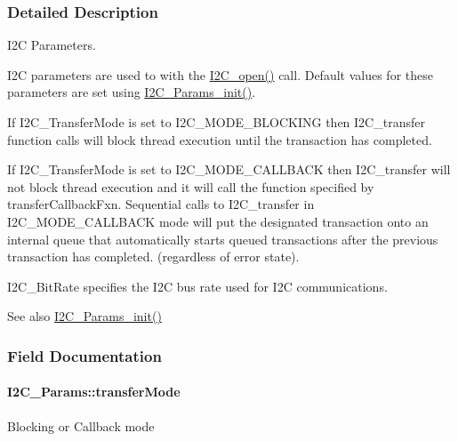 \subsubsection{Detailed Description}
I2\+C Parameters. 

I2\+C parameters are used to with the \hyperlink{_i2_c_8h_ae1aa99e1fee4517406018e10025cca0e}{I2\+C\+\_\+open()} call. Default values for these parameters are set using \hyperlink{_i2_c_8h_ab11636302074d67180207ab81ceb323c}{I2\+C\+\_\+\+Params\+\_\+init()}.

If I2\+C\+\_\+\+Transfer\+Mode is set to I2\+C\+\_\+\+M\+O\+D\+E\+\_\+\+B\+L\+O\+C\+K\+I\+N\+G then I2\+C\+\_\+transfer function calls will block thread execution until the transaction has completed.

If I2\+C\+\_\+\+Transfer\+Mode is set to I2\+C\+\_\+\+M\+O\+D\+E\+\_\+\+C\+A\+L\+L\+B\+A\+C\+K then I2\+C\+\_\+transfer will not block thread execution and it will call the function specified by transfer\+Callback\+Fxn. Sequential calls to I2\+C\+\_\+transfer in I2\+C\+\_\+\+M\+O\+D\+E\+\_\+\+C\+A\+L\+L\+B\+A\+C\+K mode will put the designated transaction onto an internal queue that automatically starts queued transactions after the previous transaction has completed. (regardless of error state).

I2\+C\+\_\+\+Bit\+Rate specifies the I2\+C bus rate used for I2\+C communications.

\begin{DoxySeeAlso}{See also}
\hyperlink{_i2_c_8h_ab11636302074d67180207ab81ceb323c}{I2\+C\+\_\+\+Params\+\_\+init()} 
\end{DoxySeeAlso}


\subsubsection{Field Documentation}
\paragraph[{transfer\+Mode}]{ I2\+C\+\_\+\+Params\+::transfer\+Mode}\label{struct_i2_c___params_a79c5c51380ffbdb21df1dff6cb57de0e}
Blocking or Callback mode 
